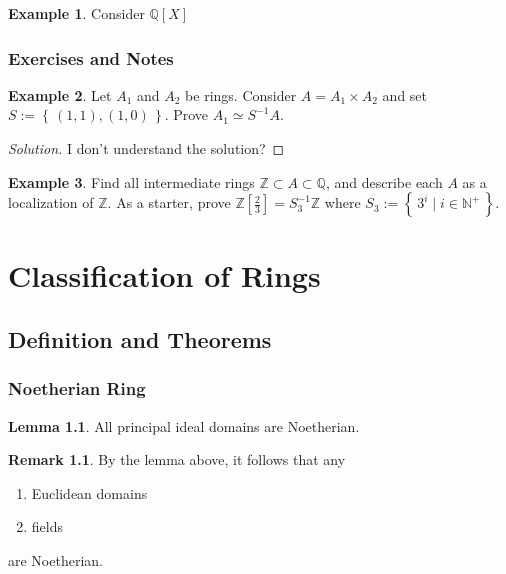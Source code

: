 \documentclass[a4paper]{book}
\theoremstyle{definition}
\newtheorem{example}{Example}[definition]
\newtheorem{lemma}[definition]{Lemma}
\newtheorem*{remark}{Remark}
\newcommand{\set}[1]{\left\{\, #1 \,\right\}}
\newcommand{\makeset}[2]{\left\{\, #1 \mid #2 \,\right\}}
\begin{document}
\begin{exmbox}
    \begin{example}
        Consider \(\mathbb{Q}[X]\)
    \end{example}
\end{exmbox}

\newpage
\subsection*{Exercises and Notes}

\begin{example}
    Let \(A_1\) and \(A_2\) be rings. Consider \(A = A_1 \times A_2\) and set \(S := \set{(1, 1), (1, 0)}\). Prove \(A_1 \simeq S^{-1}A\).
\end{example}

\begin{proof}[Solution]
    I don't understand the solution?
\end{proof}


\begin{example}
    Find all intermediate rings \(\mathbb{Z} \subset A \subset \mathbb{Q}\), and describe each \(A\) as a localization of \(\mathbb{Z}\). As a starter, prove \(\mathbb{Z}\left[\frac{2}{3}\right] = S_3^{-1} \mathbb{Z}\) where \(S_3 := \makeset{3^i}{i \in \mathbb{N}^+}\).
\end{example}






\chapter{Classification of Rings}
\section{Definition and Theorems}
\subsection{Noetherian Ring}

\begin{thmbox}
    \begin{lemma}
        All principal ideal domains are Noetherian.
    \end{lemma}
\end{thmbox}

\begin{rembox}
    \begin{remark}
        By the lemma above, it follows that any
        \begin{enumerate}
            \item Euclidean domains
            \item fields
        \end{enumerate}
        are Noetherian.
    \end{remark}
\end{rembox}
\end{document}
